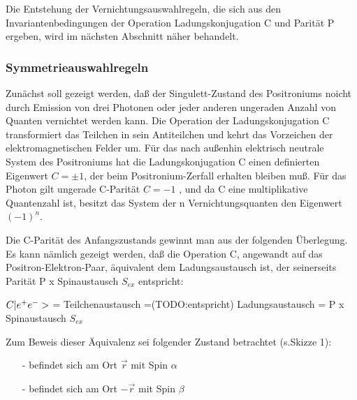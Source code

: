 Die Entstehung der Vernichtungsauswahlregeln, die sich aus den Invariantenbedingungen der Operation Ladungskonjugation C und Parität P ergeben, wird im nächsten Abschnitt näher behandelt.

\subsubsection{Symmetrieauswahlregeln}
Zunächst soll gezeigt werden, daß der Singulett-Zustand des Positroniums noicht durch Emission von drei Photonen oder jeder anderen ungeraden Anzahl von Quanten vernichtet werden kann. Die Operation der Ladungskonjugation C transformiert das Teilchen in sein Antiteilchen und kehrt das Vorzeichen der elektromagnetischen Felder um.
Für das nach außenhin elektrisch neutrale System des Positroniums hat die Ladungskonjugation C einen definierten Eigenwert $C=\pm1$, der beim Positronium-Zerfall erhalten bleiben muß. Für das Photon gilt ungerade C-Parität $C=-1$ , und da C eine multiplikative Quantenzahl ist, besitzt das System der n Vernichtungsquanten den Eigenwert $(-1)^n$.

Die C-Parität des Anfangszustands gewinnt man aus der folgenden Überlegung. Es kann nämlich gezeigt werden, daß die Operation C, angewandt auf das Positron-Elektron-Paar, äquivalent dem Ladungsaustausch ist, der seinerseits Parität P x Spinaustausch $S_{ex}$ entspricht:

$C | e^+ e^- >$ = Teilchenaustausch =(TODO:entspricht) Ladungsaustausch = P x Spinaustausch $S_{ex}$

Zum Beweis dieser Äquivalenz sei folgender Zustand betrachtet (s.Skizze 1):
\begin{itemize}
 \item[-] \elektron befindet sich am Ort $\vec{r}$ mit Spin $\alpha$
 \item[-] \positron befindet sich am Ort $-\vec{r}$ mit Spin $\beta$
\end{itemize}
 